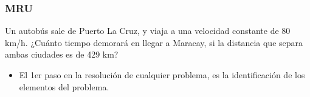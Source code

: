 \documentclass{beamer}
\begin{document}
\begin{frame}
\frametitle{MRU}
% 
 
Un {{ autob\'us }} sale de Puerto La Cruz, y viaja a una
velocidad constante de 80 km/h. ¿Cu\'anto tiempo
demorar\'a en llegar a Maracay, si la distancia que separa
ambas ciudades es de 429 km?

 
\begin{itemize}                                                              

\item El 1er paso en la resoluci\'on de cualquier problema, es la
identificaci\'on de los elementos del problema.            
              
\end{itemize}                                                 
 
 
\scalebox{1} %
{
}

\end{frame}
\end{document}
